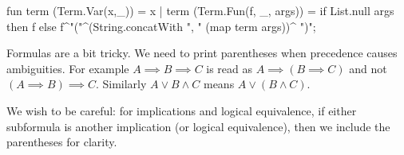 \nwenddocs{}\endmoddef\nwstartdeflinemarkup{}\nwenddeflinemarkup
fun term (Term.Var(x,_)) = x
  | term (Term.Fun(f, _, args)) =
      if List.null args
      then f
      else f^"("^(String.concatWith ", "
                                    (map term args))^
           ")";
\eatline
{}\nwendcode{}\nwdocspar
\begin{node}
Formulas are a bit tricky. We need to print parentheses when
precedence causes ambiguities. For example $A\implies B\implies C$
is read as $A\implies(B\implies C)$ and not $(A\implies B)\implies C$.
Similarly $A\lor B\land C$ means $A\lor(B\land C)$.

We wish to be careful: for implications and logical equivalence, if
either subformula is another implication (or logical equivalence),
then we include the parentheses for clarity.
\end{node}

